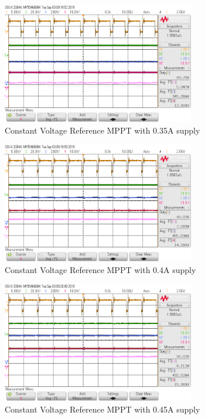 \documentclass[]{article}
\begin{document}
                \begin{figure}[H]
                    \centering
                	\includegraphics[width=0.75\textwidth]{Lab3Results/0_35A_Supply}
                    \caption{Constant Voltage Reference MPPT with 0.35A supply}
                    \label{fig:Lab3_0.35A}
                \end{figure}
                \begin{figure}[H]
                    \centering
                    \includegraphics[width=0.75\textwidth]{Lab3Results/0_40A_Supply}
                    \caption{Constant Voltage Reference MPPT with 0.4A supply}
                    \label{fig:Lab3_0.4A}
                \end{figure}
                \begin{figure}[H]
                    \centering
                    \includegraphics[width=0.75\textwidth]{Lab3Results/0_45A_Supply}
                    \caption{Constant Voltage Reference MPPT with 0.45A supply}
                    \label{fig:Lab3_0.45A}
                \end{figure}
\end{document}
